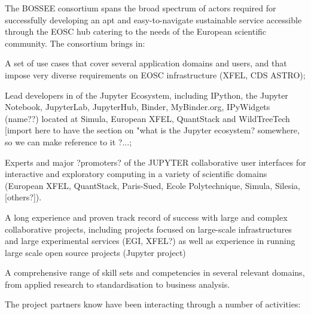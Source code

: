 The BOSSEE consortium spans the broad spectrum of actors required for successfully developing an apt and easy-to-navigate sustainable service accessible through the EOSC hub catering to the needs of the European scientific community. The consortium brings in:
\begin{compactitem}
\item A set of use cases that cover several application domains and users, and that impose very diverse requirements on EOSC infrastructure (XFEL, CDS ASTRO);
\item Lead developers in of the Jupyter Ecosystem, including IPython, the Jupyter Notebook, JupyterLab, JupyterHub, Binder, MyBinder.org, IPyWidgets (name??) located at Simula, European XFEL, QuantStack and WildTreeTech [import here to have the section on "what is the Jupyter ecosystem? somewhere, so we can make reference to it ?...;
\item Experts and major ?promoters? of the JUPYTER collaborative user interfaces for interactive and exploratory computing in a variety of scientific domains (European XFEL, QuantStack, Paris-Sued, Ecole Polytechnique, Simula, Silesia, [others?]).
\item A long experience and proven track record of success with large and complex collaborative projects, including projects focused on large-scale infrastructures and large experimental services (EGI, XFEL?) as well as experience in running large scale open source projects (Jupyter project)
\item A comprehensive range of skill sets and competencies in several relevant domains, from applied research to standardisation to business
analysis.
\end{compactitem}


The project partners know have been interacting through a number of
activities:


